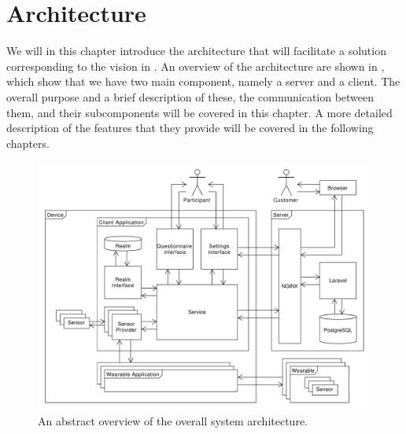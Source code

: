 
\chapter{Architecture}
\label{cha:architecture}

We will in this chapter introduce the architecture that will facilitate a solution corresponding to the vision in . An overview of the architecture are shown in , which show that we have two main component, namely a server and a client. The overall purpose and a brief description of these, the communication between them, and their subcomponents will be covered in this chapter. A more detailed description of the features that they provide will be covered in the following chapters.

\begin{figure}[!htbp]
    \centering
    \includegraphics[width=\textwidth]{graphic/architecture/architecture.pdf}
    \caption{An abstract overview of the overall system architecture.}
    \label{fig:system_architecture}
\end{figure}
\FloatBarrier


